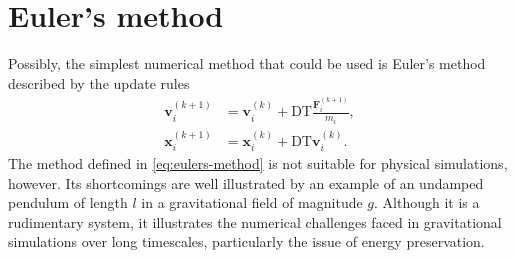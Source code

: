 \section{Euler's method}
Possibly, the simplest numerical method that could be used is Euler's method described by the update rules
\begin{equation}\label{eq:eulers-method}
    \begin{aligned}
        \mathbf{v}_i^{(k+1)} & = \mathbf{v}_i^{(k)} + \textrm{DT} \frac{\mathbf{F}^{(k+1)}_i}{m_i}, \\
        \mathbf{x}_i^{(k+1)} & = \mathbf{x}_i^{(k)} + \textrm{DT} \mathbf{v}_i^{(k)}.
    \end{aligned}
\end{equation}
The method defined in \autoref{eq:eulers-method} is not suitable for physical simulations, however.
Its shortcomings are well illustrated by an example of an undamped pendulum of length $l$ in a gravitational field of magnitude $g$.
Although it is a rudimentary system, it illustrates the numerical challenges faced in gravitational simulations over long timescales, particularly the issue of energy preservation.

